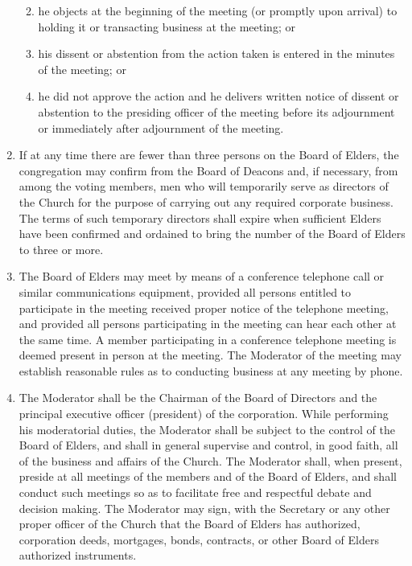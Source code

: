 \documentclass[
]{book}
\providecommand{\tightlist}{%
  \setlength{\itemsep}{0pt}\setlength{\parskip}{0pt}}
\begin{document}
\begin{enumerate}
  \begin{enumerate}
  \def\labelenumii{(\arabic{enumii})}
  \tightlist
  \item
    he objects at the beginning of the meeting (or promptly upon arrival) to holding it or transacting business at the meeting; or
  \item
    his dis­sent or abstention from the action taken is entered in the minutes of the meeting; or
  \item
    he did not approve the action and he delivers written notice of dissent or abstention to the presiding officer of the meeting before its adjournment or immediately after adjournment of the meeting.
  \end{enumerate}
\item
  If at any time there are fewer than three persons on the Board of Elders, the congregation may confirm from the Board of Deacons and, if necessary, from among the voting members, men who will temporarily serve as directors of the Church for the purpose of carrying out any required corporate business. The terms of such temporary directors shall expire when sufficient Elders have been confirmed and ordained to bring the number of the Board of Elders to three or more.
\item
  The Board of Elders may meet by means of a conference telephone call or similar communications equipment, provided all persons entitled to participate in the meeting received proper notice of the telephone meeting, and provided all persons participating in the meeting can hear each other at the same time. A member participating in a conference telephone meeting is deemed present in person at the meeting. The Moderator of the meeting may establish reasonable rules as to conducting business at any meeting by phone.
\item
  The Moderator shall be the Chairman of the Board of Directors and the principal executive officer (president) of the corporation. While performing his moderatorial duties, the Moderator shall be subject to the control of the Board of Elders, and shall in general supervise and control, in good faith, all of the business and affairs of the Church. The Moderator shall, when present, preside at all meetings of the members and of the Board of Elders, and shall conduct such meetings so as to facilitate free and respectful debate and decision making. The Moderator may sign, with the Secretary or any other proper officer of the Church that the Board of Elders has authorized, corporation deeds, mortgages, bonds, contracts, or other Board of Elders authorized instruments.

\end{enumerate}
\end{document}
